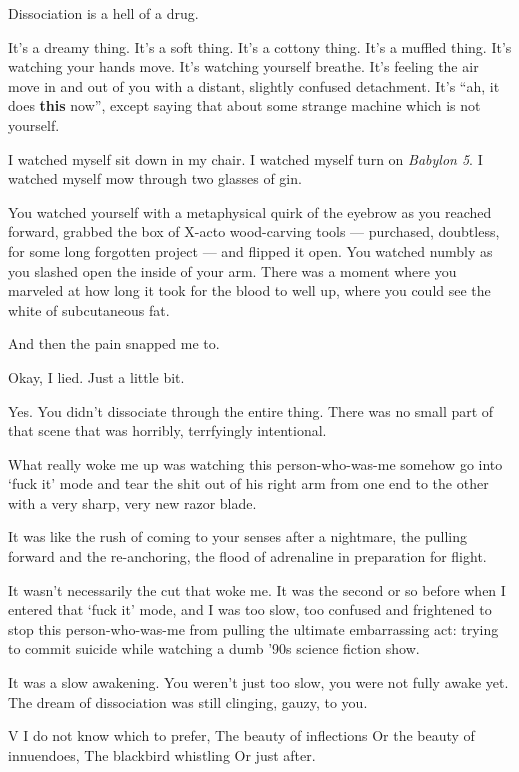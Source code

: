 \begin{paracol}{2}
\begin{leftcolumn}
Dissociation is a hell of a drug.

\begin{ally}
It's a dreamy thing. It's a soft thing. It's a cottony thing. It's a muffled thing. It's watching your hands move. It's watching yourself breathe. It's feeling the air move in and out of you with a distant, slightly confused detachment. It's ``ah, it does \textbf{this} now'', except saying that about some strange machine which is not yourself.
\end{ally}
I watched myself sit down in my chair. I watched myself turn on \emph{Babylon 5}. I watched myself mow through two glasses of gin.

\begin{ally}
You watched yourself with a metaphysical quirk of the eyebrow as you reached forward, grabbed the box of X-acto wood-carving tools --- purchased, doubtless, for some long forgotten project --- and flipped it open. You watched numbly as you slashed open the inside of your arm. There was a moment where you marveled at how long it took for the blood to well up, where you could see the white of subcutaneous fat.
\end{ally}
And then the pain snapped me to.
\newpage

\noindent Okay, I lied. Just a little bit.

\begin{ally}
Yes. You didn't dissociate through the entire thing. There was no small part of that scene that was horribly, terrfyingly intentional.
\end{ally}
What really woke me up was watching this person-who-was-me somehow go into `fuck it' mode and tear the shit out of his right arm from one end to the other with a very sharp, very new razor blade.

It was like the rush of coming to your senses after a nightmare, the pulling forward and the re-anchoring, the flood of adrenaline in preparation for flight.

It wasn't necessarily the cut that woke me. It was the second or so before when I entered that `fuck it' mode, and I was too slow, too confused and frightened to stop this person-who-was-me from pulling the ultimate embarrassing act: trying to commit suicide while watching a dumb '90s science fiction show.

\begin{ally}
It was a slow awakening. You weren't just too slow, you were not fully awake yet. The dream of dissociation was still clinging, gauzy, to you.
\end{ally}
V I do not know which to prefer, The beauty of inflections Or the beauty of innuendoes, The blackbird whistling Or just after.


\end{leftcolumn}
\end{paracol}
